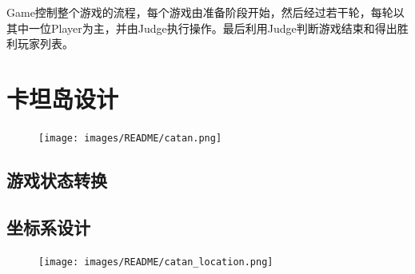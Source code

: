\documentclass[export, 12pt, letterpaper]{ctexrep}
\begin{document}
Game控制整个游戏的流程，每个游戏由准备阶段开始，然后经过若干轮，每轮以其中一位Player为主，并由Judge执行操作。最后利用Judge判断游戏结束和得出胜利玩家列表。

\chapter{卡坦岛设计}
\begin{center}\begin{figure}[H] \centering \texttt{[image: images/README/catan.png]}\caption*{}
\end{figure} \end{center}

\section{游戏状态转换}


\section{坐标系设计}
\begin{center}\begin{figure}[H] \centering \texttt{[image: images/README/catan\_location.png]}\caption*{}
\end{figure} \end{center}
\end{document}
